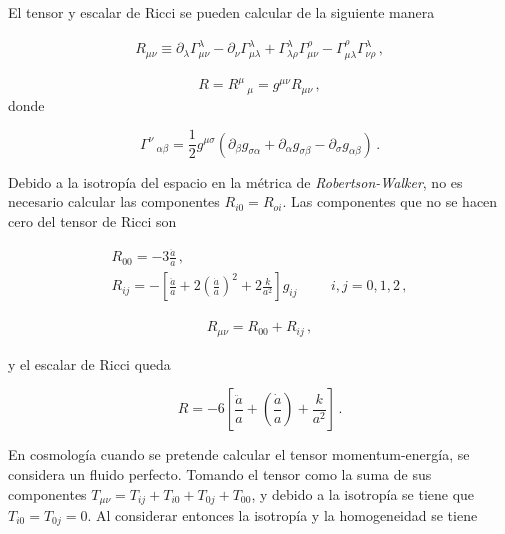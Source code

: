 El tensor y escalar de Ricci se pueden calcular de la siguiente manera

\begin{eqnarray}
R_{\mu\nu} \equiv \partial_{\lambda}\Gamma^{\lambda}_{\mu\nu} - \partial_{\nu}\Gamma^{\lambda}_{\mu\lambda} + \Gamma^{\lambda}_{\lambda\rho} \Gamma^{\rho}_{\mu\nu} - \Gamma^{\rho}_{\mu\lambda} \Gamma^{\lambda}_{\nu\rho}\,,
\end{eqnarray}

\begin{equation}
R=R^{\mu}\,_{\mu}=g^{\mu\nu}R_{\mu\nu}\,,
\label{eq:Tensor_Ricci}
\end{equation}
%
donde 

\begin{equation}
\Gamma^{\nu} \,_{\alpha\beta}=\frac{1}{2}g^{\mu\sigma}(\partial_{\beta} g_{\sigma\alpha}+\partial_{\alpha} g_{\sigma\beta}-\partial_{\sigma} g_{\alpha\beta})\,.
\end{equation}

Debido a la isotropía del espacio en la métrica de \textit{Robertson-Walker}, no es necesario calcular las componentes $R_{i0}=R_{oi}$. Las componentes que no se hacen cero del tensor de Ricci son


\begin{eqnarray}
R_{00}=-3\frac{\ddot{a}}{a}\,, \hspace{2cm} \\
R_{ij}=-\left[\frac{\ddot{a}}{a}+ 2\left(\frac{\dot{a}}{a}\right)^{2} + 2\frac{k}{a^{2}} \right]g_{ij} \hspace{1cm} i,j=0,1,2\,,
\end{eqnarray}

\begin{align}
R_{\mu\nu}=R_{00}+R_{ij}\,,
\label{eq: tensor_Ricci}
\end{align}

y el escalar de Ricci queda 

\begin{equation}
R=-6\left[\frac{\ddot{a}}{a} + \left(\frac{\dot{a}}{a} \right) + \frac{k}{a^{2}} \right]\,.
\label{eq:Ricci_escalar}
\end{equation}

En cosmología cuando se pretende calcular el tensor momentum-energía, se considera  un fluido perfecto. Tomando el tensor como la suma de sus componentes $T_{\mu\nu}=T_{ij}+T_{i0}+T_{0j}+T_{00}$, y debido a la isotropía se tiene que $T_{i0}=T_{0j}=0$. Al considerar entonces la isotropía y la homogeneidad se tiene

